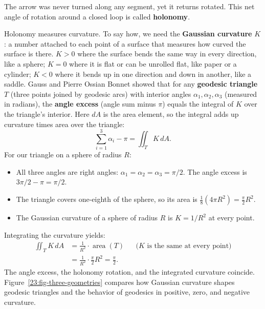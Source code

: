 The arrow was never turned along any segment, yet it returns rotated. This net angle of rotation around a closed loop is called \textbf{holonomy}.

Holonomy measures curvature. To say how, we need the \textbf{Gaussian curvature} $K$: a number attached to each point of a surface that measures how curved the surface is there. $K > 0$ where the surface bends the same way in every direction, like a sphere; $K = 0$ where it is flat or can be unrolled flat, like paper or a cylinder; $K < 0$ where it bends up in one direction and down in another, like a saddle. Gauss and Pierre Ossian Bonnet showed that for any \textbf{geodesic triangle} $T$ (three points joined by geodesic arcs) with interior angles $\alpha_1, \alpha_2, \alpha_3$ (measured in radians), the \textbf{angle excess} (angle sum minus $\pi$) equals the integral of $K$ over the triangle's interior. Here $dA$ is the area element, so the integral adds up curvature times area over the triangle:
\[
\sum_{i=1}^3 \alpha_i - \pi = \iint_T K \, dA.
\]
For our triangle on a sphere of radius $R$:
\begin{itemize}
\item All three angles are right angles: $\alpha_1 = \alpha_2 = \alpha_3 = \pi/2$. The angle excess is $3\pi/2 - \pi = \pi/2$.
\item The triangle covers one-eighth of the sphere, so its area is $\tfrac{1}{8}(4\pi R^2) = \tfrac{\pi}{2} R^2$.
\item The Gaussian curvature of a sphere of radius $R$ is $K = 1/R^2$ at every point.
\end{itemize}
Integrating the curvature yields:
\begin{align*}
\iint_T K \, dA &= \frac{1}{R^2} \cdot \operatorname{area}(T) && \text{($K$ is the same at every point)}\\
&= \frac{1}{R^2} \cdot \frac{\pi}{2} R^2 = \frac{\pi}{2}.
\end{align*}
The angle excess, the holonomy rotation, and the integrated curvature coincide. Figure~\ref{23:fig-three-geometries} compares how Gaussian curvature shapes geodesic triangles and the behavior of geodesics in positive, zero, and negative curvature.

